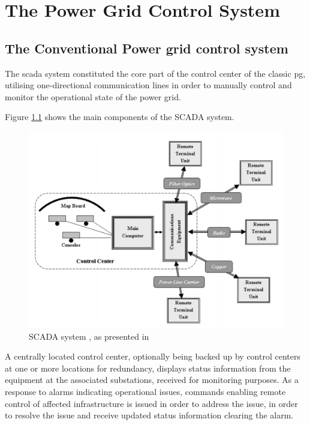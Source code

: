 \chapter{The Power Grid Control System}
\section{The Conventional Power grid control system}


The \acrshort{scada} system constituted the core part of the control center of the classic \acrlong{pg}, utilising one-directional communication lines in order to manually control and monitor the operational state of the power grid.

Figure \ref{fig:Blume-SCADA-system} shows the main components of the SCADA system.

\begin{figure}[ht]
\includegraphics[width=\linewidth]{figures/Blume-SCADA-system.png}
\caption[SCADA system]{SCADA system , as presented in \cite{BlumeStevenW2007Epsb}}
\label{fig:Blume-SCADA-system}
\end{figure}



A centrally located control center, optionally being backed up by control centers at one or more locations for redundancy, displays status information from the equipment at the associated substations, received for monitoring purposes. As a response to alarms indicating operational issues, commands enabling remote control of affected infrastructure is issued in order to address the issue, in order to resolve the issue and receive updated status information clearing the alarm. 




